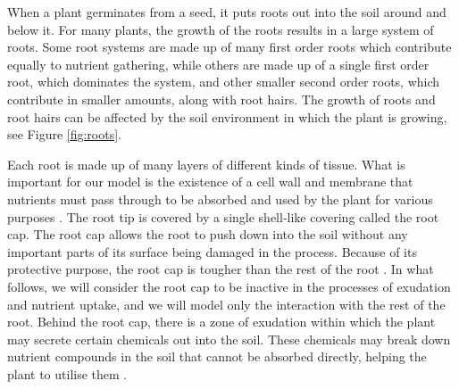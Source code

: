\documentclass[11pt]{article}
\numberwithin{equation}{section}
\begin{document}
When a plant germinates from a seed, it puts roots out into the soil around and below it. For many plants, the growth of the roots results in a large system of roots.
Some root systems are made up of many first order roots which contribute equally to nutrient gathering, while others are made up of a single first order root, which dominates the system, and other smaller second order roots, which contribute in smaller amounts, along with root hairs. 
The growth of roots and root hairs can be affected by the soil environment in which the plant is growing, see Figure \ref{fig:roots}.

Each root is made up of many layers of different kinds of tissue. What is important for our model is the existence of a cell wall and membrane that nutrients must pass through to be absorbed and used by the plant for various purposes \cite{PALLARDY2008255}. The root tip is covered by a single shell-like covering called the root cap. The root cap allows the root to push down into the soil without any important parts of its surface being damaged in the process. Because of its protective purpose, the root cap is tougher than the rest of the root \cite{haberlandt1914}. In what follows, we will consider the root cap to be inactive in the processes of exudation and nutrient uptake, and we will model only the interaction with the rest of the root.
Behind the root cap, there is a zone of exudation within which the plant may secrete certain chemicals out into the soil. These chemicals may break down nutrient compounds in the soil that cannot be absorbed directly, helping the plant to utilise them \cite{10.3389/fpls.2019.00157}.
\end{document}
